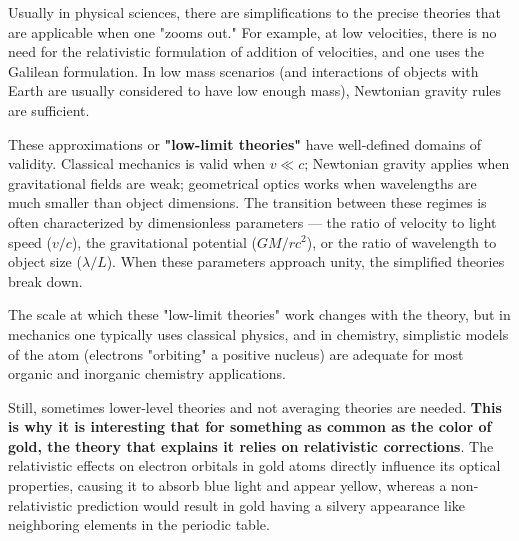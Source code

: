 \begin{figure}[H]
\label{fig:relativistic_energy_levels_final}
\end{figure}


\begin{commentary}
Usually in physical sciences, there are simplifications to the precise theories that are applicable when one "zooms out." For example, at low velocities, there is no need for the relativistic formulation of addition of velocities, and one uses the Galilean formulation. In low mass scenarios (and interactions of objects with Earth are usually considered to have low enough mass), Newtonian gravity rules are sufficient.

These approximations or \textbf{"low-limit theories"} have well-defined domains of validity. Classical mechanics is valid when $v \ll c$; Newtonian gravity applies when gravitational fields are weak; geometrical optics works when wavelengths are much smaller than object dimensions. The transition between these regimes is often characterized by dimensionless parameters — the ratio of velocity to light speed ($v/c$), the gravitational potential ($GM/rc^2$), or the ratio of wavelength to object size ($\lambda/L$). When these parameters approach unity, the simplified theories break down.

The scale at which these "low-limit theories" work changes with the theory, but in mechanics one typically uses classical physics, and in chemistry, simplistic models of the atom (electrons "orbiting" a positive nucleus) are adequate for most organic and inorganic chemistry applications.

Still, sometimes lower-level theories and not averaging theories are needed. \textbf{This is why it is interesting that for something as common as the color of gold, the theory that explains it relies on relativistic corrections}. The relativistic effects on electron orbitals in gold atoms directly influence its optical properties, causing it to absorb blue light and appear yellow, whereas a non-relativistic prediction would result in gold having a silvery appearance like neighboring elements in the periodic table.


\end{commentary}

